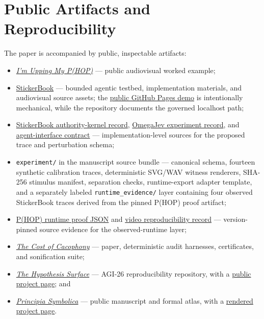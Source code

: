 \documentclass[11pt]{article}
\begin{document}
\section*{Public Artifacts and Reproducibility}
The paper is accompanied by public, inspectable artifacts:
\begin{itemize}[leftmargin=*]
    \item \href{https://youtu.be/vpu4tmhyj04}{\emph{I'm Upping My P(HOP)}} --- public audiovisual worked example;
    \item \href{https://github.com/PaulTiffany/stickerbook}{StickerBook} --- bounded agentic testbed, implementation materials, and audiovisual source assets; the \href{https://paultiffany.github.io/stickerbook/}{public GitHub Pages demo} is intentionally mechanical, while the repository documents the governed localhost path;
    \item \href{https://github.com/PaulTiffany/stickerbook/blob/main/core/README.md}{StickerBook authority-kernel record}, \href{https://github.com/PaulTiffany/stickerbook/blob/main/jev/EXPERIMENT.md}{OmegaJev experiment record}, and \href{https://github.com/PaulTiffany/stickerbook/blob/main/docs/AGENT-INTERFACE.md}{agent-interface contract} --- implementation-level sources for the proposed trace and perturbation schema;
    \item \texttt{experiment/} in the manuscript source bundle --- canonical schema, fourteen synthetic calibration traces, deterministic SVG/WAV witness renderers, SHA-256 stimulus manifest, separation checks, runtime-export adapter template, and a separately labeled \texttt{runtime\_evidence/} layer containing four observed StickerBook traces derived from the pinned P(HOP) proof artifact;
    \item \href{https://github.com/PaulTiffany/stickerbook/blob/453a90f846c61b9c5c8c8f007db4e85ce307fa28/video/data/proof.json}{P(HOP) runtime proof JSON} and \href{https://github.com/PaulTiffany/stickerbook/blob/453a90f846c61b9c5c8c8f007db4e85ce307fa28/video/README.md}{video reproducibility record} --- version-pinned source evidence for the observed-runtime layer;
    \item \href{https://github.com/PaulTiffany/cost}{\emph{The Cost of Cacophony}} --- paper, deterministic audit harnesses, certificates, and sonification suite;
    \item \href{https://github.com/PaulTiffany/hypothesis-surface-agi26}{\emph{The Hypothesis Surface}} --- AGI-26 reproducibility repository, with a \href{https://paultiffany.github.io/hypothesis-surface-agi26/}{public project page}; and
    \item \href{https://github.com/PaulTiffany/Principia-Symbolica}{\emph{Principia Symbolica}} --- public manuscript and formal atlas, with a \href{https://paultiffany.github.io/Principia-Symbolica/}{rendered project page}.
\end{itemize}
\end{document}
